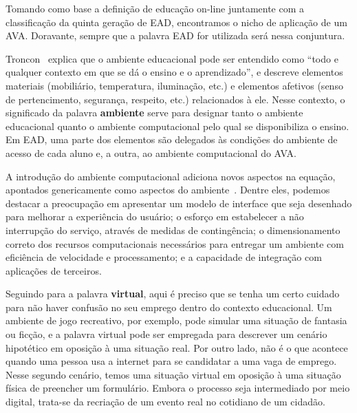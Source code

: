 Tomando como base a definição de educação on-line juntamente com a classificação da quinta geração de EAD, encontramos o nicho de aplicação de um \acrlong{AVA}. Doravante, sempre que a palavra EAD for utilizada será nessa conjuntura.

Troncon~\cite{RMRP86614} explica que o ambiente educacional pode ser entendido como ``todo e qualquer contexto em que se dá o ensino e o aprendizado'', e descreve elementos materiais (mobiliário, temperatura, iluminação, etc.) e elementos afetivos (senso de pertencimento, segurança, respeito, etc.) relacionados à ele. Nesse contexto, o significado da palavra \textbf{ambiente} serve para designar tanto o ambiente educacional quanto o ambiente computacional pelo qual se disponibiliza o ensino. Em EAD, uma parte dos elementos são delegados às condições do ambiente de acesso de cada aluno e, a outra, ao ambiente computacional do AVA. %

A introdução do ambiente computacional adiciona novos aspectos na equação, apontados genericamente como aspectos do ambiente~\cite{Ferreira@2016}. Dentre eles, podemos destacar a preocupação em apresentar um modelo de interface que seja desenhado para melhorar a experiência do usuário; o esforço em estabelecer a não interrupção do serviço, através de medidas de contingência; o dimensionamento correto dos recursos computacionais necessários para entregar um ambiente com eficiência de velocidade e processamento; e a capacidade de integração com aplicações de terceiros. 


Seguindo para a palavra \textbf{virtual}, aqui é preciso que se tenha um certo cuidado para não haver confusão no seu emprego dentro do contexto educacional. Um ambiente de jogo recreativo, por exemplo, pode simular uma situação de fantasia ou ficção, e a palavra virtual pode ser empregada para descrever um cenário hipotético em oposição à uma situação real. Por outro lado, não é o que acontece quando uma pessoa usa a internet para se candidatar a uma vaga de emprego. Nesse segundo cenário, temos uma situação virtual em oposição à uma situação física de preencher um formulário. Embora o processo seja intermediado por meio digital, trata-se da recriação de um evento real no cotidiano de um cidadão. 

